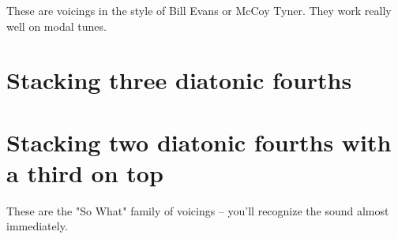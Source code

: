 
These are voicings in the style of Bill Evans or McCoy Tyner.  They work really well on modal tunes.

\section{Stacking three diatonic fourths}

\section{Stacking two diatonic fourths with a third on top}

These are the "So What" family of voicings -- you'll recognize the sound almost immediately.